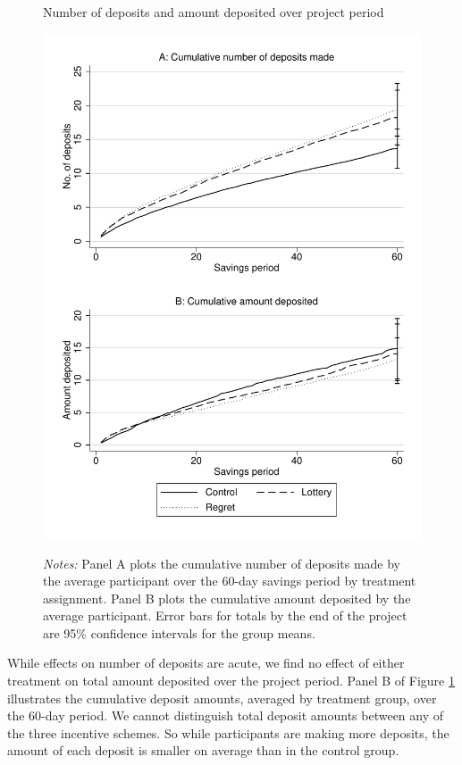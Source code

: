\documentclass[11pt]{article}
\begin{document}
		

		\begin{figure}[ht]
			\caption{Number of deposits and amount deposited over project period}
			\includegraphics[height=0.85\textheight]{../../figures/line-cumdeposits.pdf}
			\label{fig:line-cumdeposits}
			\caption*{\footnotesize \emph{Notes:} Panel A plots the cumulative number of deposits made by the average participant over the 60-day savings period by treatment assignment. Panel B plots the cumulative amount deposited by the average participant. Error bars for totals by the end of the project are 95\% confidence intervals for the group means.}
		\end{figure}

		\clearpage

		While effects on number of deposits are acute, we find no effect of either treatment on total amount deposited over the project period. Panel B of Figure \ref{fig:line-cumdeposits} illustrates the cumulative deposit amounts, averaged by treatment group, over the 60-day period. We cannot distinguish total deposit amounts between any of the three incentive schemes. So while participants are making more deposits, the amount of each deposit is smaller on average than in the control group.
\end{document}
